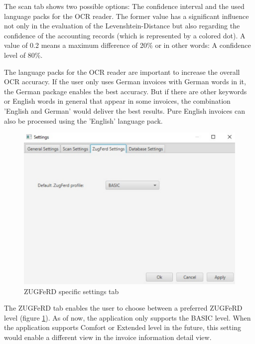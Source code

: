 The scan tab shows two possible options: The confidence interval and the used language packs for the OCR reader. The former value has a significant influence not only in the evaluation of the Levenshtein-Distance but also regarding the confidence of the accounting records (which is represented by a colored dot). A value of 0.2 means a maximum difference of 20\% or in other words: A confidence level of 80\%.

The language packs for the OCR reader are important to increase the overall OCR accuracy. If the user only uses German invoices with German words in it, the German package enables the best accuracy. But if there are other keywords or English words in general that appear in some invoices, the combination 'English and German' would deliver the best results. Pure English invoices can also be processed using the 'English' language pack.

\begin{figure}[ht!]
\centering
\includegraphics[scale=0.6,natwidth=208,natheight=150]{Images/GUI/settings_ZugFerd.pdf}
\caption{ZUGFeRD specific settings tab \label{settings_ZugFerd}}
\end{figure}

The ZUGFeRD tab enables the user to choose between a preferred ZUGFeRD level (figure \ref{settings_ZugFerd}). As of now, the application only supports the BASIC level. When the application supports Comfort or Extended level in the future, this setting would enable a different view in the invoice information detail view.


